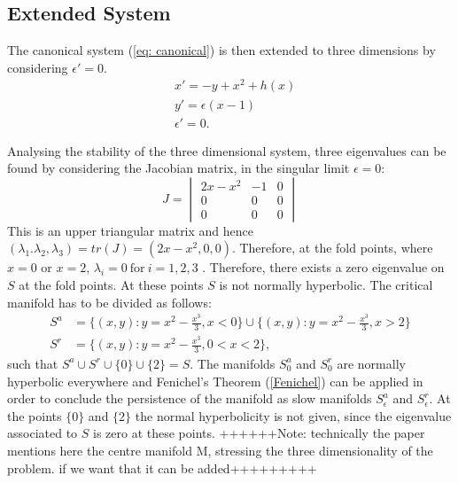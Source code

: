 \subsection{Extended System}
The canonical system (\ref{eq: canonical}) is then extended to three dimensions by considering $\epsilon'=0$. 
\begin{equation} \label{extended FS}
    \begin{aligned}
        &x'=-y+x^2+h(x) \\
        &y'=\epsilon(x-1)\\
        &\epsilon'=0.
    \end{aligned}
\end{equation}


Analysing the stability of the three dimensional system, three eigenvalues can be found by considering the Jacobian matrix, in the singular limit $\epsilon=0$: 
\begin{equation} 
    J=\begin{vmatrix} 2x-x^2 & -1&0 \\ 0 & 0&0\\0&0&0\end{vmatrix}
    \label{eq: Eigenvalues}
\end{equation}
This is an upper triangular matrix and hence $(\lambda_1.\lambda_2,\lambda_3)=tr(J)= (2x-x^2,0,0)$. Therefore, at the fold points, where $x=0$ or $x=2$, $\lambda_i=0 \ \text{for} \ i=1,2,3$ . Therefore, there exists a zero eigenvalue on $S$ at the fold points. At these points $S$ is not normally hyperbolic.
The critical manifold has to be divided as follows:
\begin{align*}
S^a &= \{ (x,y): y = x^2-\frac{x^3}{3}, x< 0 \} \cup  \{ (x,y): y = x^2-\frac{x^3}{3}, x>2 \} \\
S^r &= \{ (x,y): y = x^2-\frac{x^3}{3}, 0< x< 2 \},
\end{align*}
such that $S^a \cup S^r \cup \{0\} \cup \{2\} = S$.
The manifolds $S^a_0$ and $S^r_0$ are normally hyperbolic everywhere and Fenichel's Theorem (\ref{Fenichel}) can be applied in order to conclude the persistence of the manifold as slow manifolds $S^a_\epsilon$ and $S^r_\epsilon$. At the points $\{0\}$ and $\{2 \}$ the normal hyperbolicity is not given, since the eigenvalue associated to $S$ is zero at these points.
++++++Note: technically the paper mentions here the centre manifold M, stressing the three dimensionality of the problem. if we want that it can be added+++++++++
\\
\\
